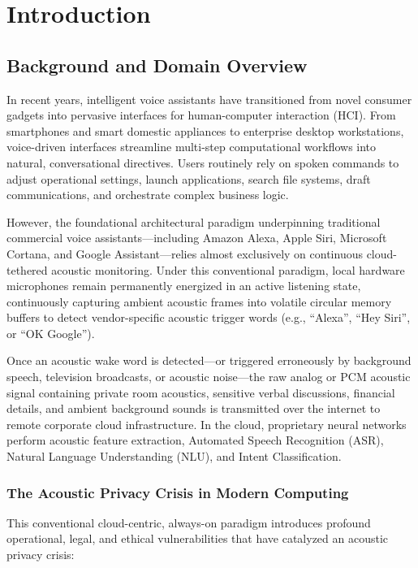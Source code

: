 \chapter{Introduction}
\label{ch:introduction}

\section{Background and Domain Overview}
In recent years, intelligent voice assistants have transitioned from novel consumer gadgets into pervasive interfaces for human-computer interaction (HCI). From smartphones and smart domestic appliances to enterprise desktop workstations, voice-driven interfaces streamline multi-step computational workflows into natural, conversational directives. Users routinely rely on spoken commands to adjust operational settings, launch applications, search file systems, draft communications, and orchestrate complex business logic. 

However, the foundational architectural paradigm underpinning traditional commercial voice assistants---including Amazon Alexa, Apple Siri, Microsoft Cortana, and Google Assistant---relies almost exclusively on continuous cloud-tethered acoustic monitoring. Under this conventional paradigm, local hardware microphones remain permanently energized in an active listening state, continuously capturing ambient acoustic frames into volatile circular memory buffers to detect vendor-specific acoustic trigger words (e.g., ``Alexa'', ``Hey Siri'', or ``OK Google''). 

Once an acoustic wake word is detected---or triggered erroneously by background speech, television broadcasts, or acoustic noise---the raw analog or PCM acoustic signal containing private room acoustics, sensitive verbal discussions, financial details, and ambient background sounds is transmitted over the internet to remote corporate cloud infrastructure. In the cloud, proprietary neural networks perform acoustic feature extraction, Automated Speech Recognition (ASR), Natural Language Understanding (NLU), and Intent Classification.

\subsection{The Acoustic Privacy Crisis in Modern Computing}
This conventional cloud-centric, always-on paradigm introduces profound operational, legal, and ethical vulnerabilities that have catalyzed an acoustic privacy crisis:

